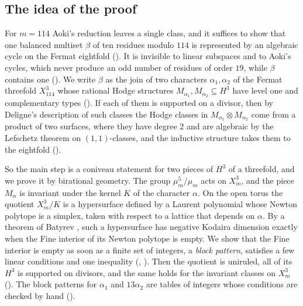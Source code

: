 \subsection*{The idea of the proof}
For $m=114$ Aoki's reduction leaves a single class, and it suffices to show
that one balanced multiset $\beta$ of ten residues modulo $114$ is
represented by an algebraic cycle on the Fermat eightfold
(). It is invisible to linear subspaces and to Aoki's cycles,
which never produce an odd number of residues of order $19$, while $\beta$
contains one (). We write $\beta$ as the join of two characters
$\alpha_{1},\alpha_{2}$ of the Fermat threefold $X^{3}_{114}$ whose rational
Hodge structures $M_{\alpha_{1}},M_{\alpha_{2}}\subseteq H^{3}$ have level
one and complementary types (). If each of them is
supported on a divisor, then by Deligne's description of such classes
\cite{Del74} the Hodge classes in $M_{\alpha_{1}}\otimes M_{\alpha_{2}}$
come from a product of two surfaces, where they have degree $2$ and are
algebraic by the Lefschetz theorem on $(1,1)$-classes, and the inductive
structure takes them to the eightfold ().

So the main step is a coniveau statement for two pieces of $H^{3}$ of a
threefold, and we prove it by birational geometry. The group $\mu_{m}^{5}/
\mu_{m}$ acts on $X^{3}_{m}$, and the piece $M_{\alpha}$ is invariant under
the kernel $K$ of the character $\alpha$. On the open torus the quotient
$X^{3}_{m}/K$ is a hypersurface defined by a Laurent polynomial whose Newton
polytope is a simplex, taken with respect to a lattice that depends on
$\alpha$. By a theorem of Batyrev \cite{Bat24}, such a hypersurface has
negative Kodaira dimension exactly when the Fine interior of its Newton
polytope is empty. We show that the Fine interior is empty as soon as a
finite set of integers, a \emph{block pattern}, satisfies a few linear
conditions and one inequality (,
). Then the quotient is uniruled, all of its $H^{3}$ is
supported on divisors, and the same holds for the invariant classes on
$X^{3}_{m}$ (). The block patterns for $\alpha_{1}$
and $13\alpha_{2}$ are tables of integers whose conditions are checked by
hand ().


